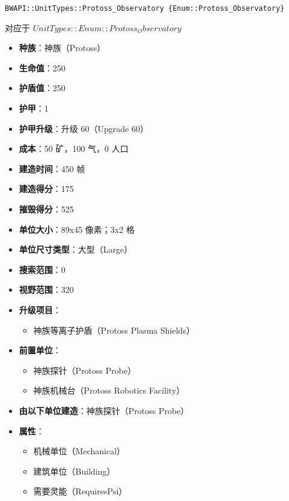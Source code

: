 \begin{tcolorbox}[colback=white, colframe=black!60!white, title=Protoss\_Observatory(), arc=0mm]
    \begin{verbatim}
BWAPI::UnitTypes::Protoss_Observatory {Enum::Protoss_Observatory}
    \end{verbatim}
    对应于  $ UnitTypes::Enum::Protoss_Observatory $ 
    \begin{itemize}
        \item \textbf{种族}：神族（Protoss）
        \item \textbf{生命值}：250
        \item \textbf{护盾值}：250
        \item \textbf{护甲}：1
        \item \textbf{护甲升级}：升级 60（Upgrade 60）
        \item \textbf{成本}：50 矿，100 气，0 人口
        \item \textbf{建造时间}：450 帧
        \item \textbf{建造得分}：175
        \item \textbf{摧毁得分}：525
        \item \textbf{单位大小}：89x45 像素；3x2 格
        \item \textbf{单位尺寸类型}：大型（Large）
        \item \textbf{搜索范围}：0
        \item \textbf{视野范围}：320
        \item \textbf{升级项目}：
            \begin{itemize}
                \item 神族等离子护盾（Protoss Plasma Shields）
            \end{itemize}
        \item \textbf{前置单位}：
            \begin{itemize}
                \item 神族探针（Protoss Probe）
                \item 神族机械台（Protoss Robotics Facility）
            \end{itemize}
        \item \textbf{由以下单位建造}：神族探针（Protoss Probe）
        \item \textbf{属性}：
            \begin{itemize}
                \item 机械单位（Mechanical）
                \item 建筑单位（Building）
                \item 需要灵能（RequiresPsi）
            \end{itemize}
    \end{itemize}
\end{tcolorbox}

